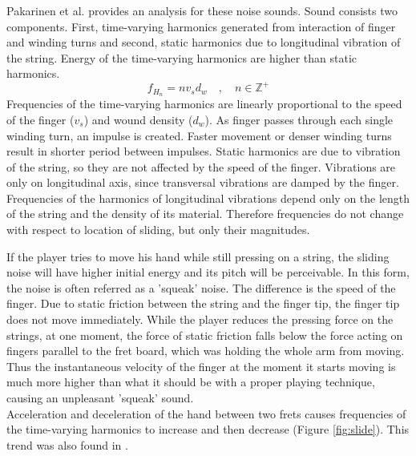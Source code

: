 Pakarinen et al. \cite{pakarinen2007analysis} provides an analysis for these noise sounds. Sound consists two components. First, time-varying harmonics generated from interaction of finger and winding turns and second, static harmonics due to longitudinal vibration of the string. Energy of the time-varying harmonics are higher than static harmonics. 
\begin{equation}\label{slide_eq}
    f_H_n = nv_sd_w \quad, \quad n \in \mathbb{Z}^+
\end{equation}
Frequencies of the time-varying harmonics are linearly proportional to the speed of the finger (\(v_s\)) and wound density (\(d_w\)). As finger passes through each single winding turn, an impulse is created. Faster movement or denser winding turns result in shorter period between impulses. Static harmonics are due to vibration of the string, so they are not affected by the speed of the finger. Vibrations are only on longitudinal axis, since transversal vibrations are damped by the finger. Frequencies of the harmonics of longitudinal vibrations depend only on the length of the string and the density of its material. Therefore frequencies do not change with respect to location of sliding, but only their magnitudes.   
  
If the player tries to move his hand while still pressing on a string, the sliding noise will have higher initial energy and its pitch will be perceivable. In this form, the noise is often referred as a 'squeak' noise. The difference is the speed of the finger. Due to static friction between the string and the finger tip, the finger tip does not move immediately. While the player reduces the pressing force on the strings, at one moment, the force of static friction falls below the force acting on fingers parallel to the fret board, which was holding the whole arm from moving. Thus the instantaneous velocity of the finger at the moment it starts moving is much more higher than what it should be with a proper playing technique, causing an unpleasant 'squeak' sound. \\

Acceleration and deceleration of the hand between two frets causes frequencies of the time-varying harmonics to increase and then decrease (Figure \ref{fig:slide}). This trend was also found in \cite{pakarinen2007analysis}. 


